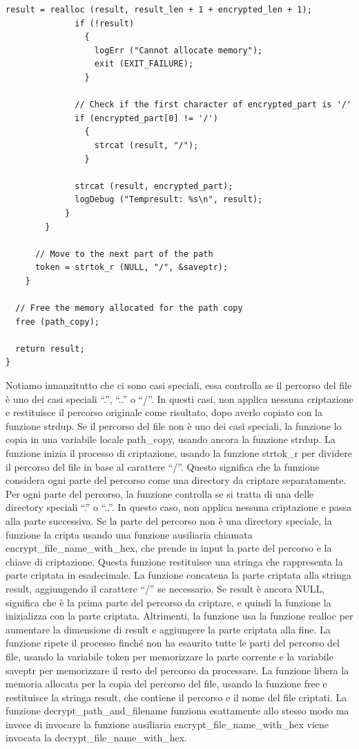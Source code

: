 \begin{lstlisting}[style=C, caption=Funzione encrypt\_path\_and\_filename, label=C-enc-path-filename.h]
              result = realloc (result, result_len + 1 + encrypted_len + 1);
              if (!result)
                {
                  logErr ("Cannot allocate memory");
                  exit (EXIT_FAILURE);
                }

              // Check if the first character of encrypted_part is '/'
              if (encrypted_part[0] != '/')
                {
                  strcat (result, "/");
                }

              strcat (result, encrypted_part);
              logDebug ("Tempresult: %s\n", result);
            }
        }

      // Move to the next part of the path
      token = strtok_r (NULL, "/", &saveptr);
    }

  // Free the memory allocated for the path copy
  free (path_copy);

  return result;
}
\end{lstlisting}

Notiamo innanzitutto che ci sono casi speciali, essa controlla se il percorso del file è uno dei casi speciali “.”, “..” o “/”. In questi casi, non applica nessuna criptazione e restituisce il percorso originale come risultato, dopo averlo copiato con la funzione strdup.
Se il percorso del file non è uno dei casi speciali, la funzione lo copia in una variabile locale 
path\_copy, usando ancora la funzione strdup.
La funzione inizia il processo di criptazione, usando la funzione strtok\_r per dividere il percorso del file in base al carattere “/”. Questo significa che la funzione considera ogni parte del percorso come una directory da criptare separatamente. Per ogni parte del percorso, la funzione controlla se si tratta di una delle directory speciali “.” o “..”. In questo caso, non applica nessuna criptazione e passa alla parte successiva.
Se la parte del percorso non è una directory speciale, la funzione la cripta usando una funzione ausiliaria chiamata encrypt\_file\_name\_with\_hex, che prende in input la parte del percorso e la chiave di criptazione. Questa funzione restituisce una stringa che rappresenta la parte criptata in esadecimale.
La funzione concatena la parte criptata alla stringa result, aggiungendo il carattere “/” se necessario. Se result è ancora NULL, significa che è la prima parte del percorso da criptare, e quindi la funzione la inizializza con la parte criptata. Altrimenti, la funzione usa la funzione realloc per aumentare la dimensione di result e aggiungere la parte criptata alla fine.
La funzione ripete il processo finché non ha esaurito tutte le parti del percorso del file, usando la variabile token per memorizzare la parte corrente e la variabile saveptr per memorizzare il resto del percorso da processare. La funzione libera la memoria allocata per la copia del percorso del file, usando la funzione free e restituisce la stringa result, che contiene il percorso e il nome del file criptati.
La funzione decrypt\_path\_and\_filename funziona esattamente allo stesso modo ma invece di invocare la funzione ausiliaria encrypt\_file\_name\_with\_hex viene invocata la decrypt\_file\_name\_with\_hex.

